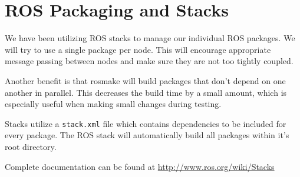 \section{ROS Packaging and Stacks}

We have been utilizing ROS stacks to manage our individual ROS packages.
We will try to use a single package per node. This will encourage
appropriate message passing between nodes and make sure they are not too
tightly coupled.

Another benefit is that rosmake will build packages that don't depend
on one another in parallel.  This decreases the build time by a small
amount, which is especially useful when making small changes during testing.

Stacks utilize a \texttt{stack.xml} file which contains dependencies to
be included for every package. The ROS stack will automatically build
all packages within it's root directory.

Complete documentation can be found at 
\url{http://www.ros.org/wiki/Stacks}
